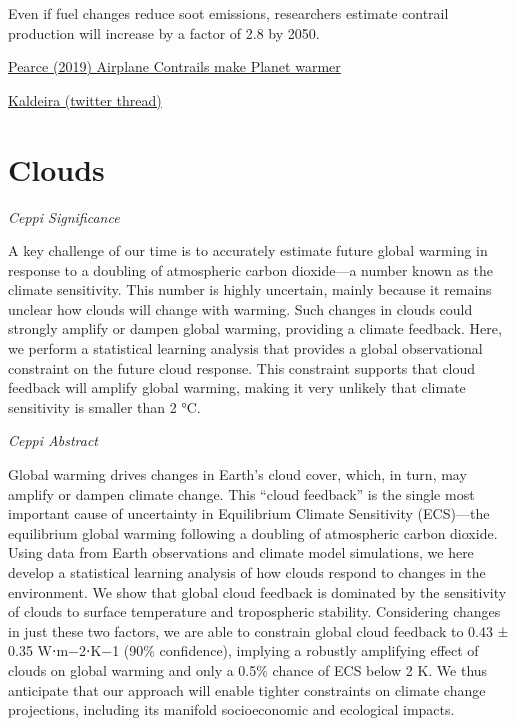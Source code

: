 \documentclass[
]{book}
\begin{document}
Even if fuel changes reduce soot emissions, researchers estimate contrail production will increase by a factor of 2.8 by 2050.

\href{https://e360.yale.edu/features/how-airplane-contrails-are-helping-make-the-planet-warmer}{Pearce (2019) Airplane Contrails make Planet warmer}

\href{https://twitter.com/KenCaldeira/status/1394648353594515460/photo/1}{Kaldeira (twitter thread)}

\hypertarget{clouds}{%
\section{Clouds}\label{clouds}}

\emph{Ceppi Significance}

A key challenge of our time is to accurately estimate future global warming in response to a doubling of atmospheric carbon dioxide---a number known as the climate sensitivity. This number is highly uncertain, mainly because it remains unclear how clouds will change with warming. Such changes in clouds could strongly amplify or dampen global warming, providing a climate feedback. Here, we perform a statistical learning analysis that provides a global observational constraint on the future cloud response. This constraint supports that cloud feedback will amplify global warming, making it very unlikely that climate sensitivity is smaller than 2 °C.

\emph{Ceppi Abstract}

Global warming drives changes in Earth's cloud cover, which, in turn, may amplify or dampen climate change. This ``cloud feedback'' is the single most important cause of uncertainty in Equilibrium Climate Sensitivity (ECS)---the equilibrium global warming following a doubling of atmospheric carbon dioxide. Using data from Earth observations and climate model simulations, we here develop a statistical learning analysis of how clouds respond to changes in the environment. We show that global cloud feedback is dominated by the sensitivity of clouds to surface temperature and tropospheric stability. Considering changes in just these two factors, we are able to constrain global cloud feedback to 0.43 ± 0.35 W⋅m−2⋅K−1 (90\% confidence), implying a robustly amplifying effect of clouds on global warming and only a 0.5\% chance of ECS below 2 K. We thus anticipate that our approach will enable tighter constraints on climate change projections, including its manifold socioeconomic and ecological impacts.
\end{document}
